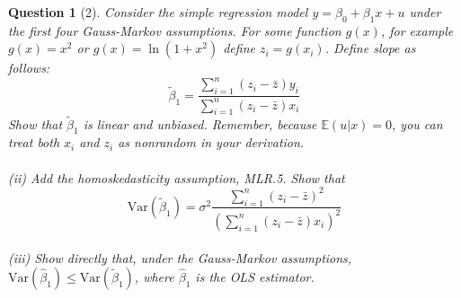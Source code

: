 \documentclass[12pt,reqno]{amsart}
\theoremstyle{plain}
\newcommand{\E}{\mathbb{E}}
\newcommand{\hb}{\hat\beta}
\newcommand{\tb}{\tilde\beta}
\newtheorem*{theorem*}{Question}
\begin{document}
\begin{theorem*}[2]
    \normalfont
    Consider the simple regression model $ y =  \beta_{0} + \beta_{1}x + u $ under the first four
    Gauss-Markov assumptions. For some function $ g(x) $, for example $ g(x) =x^{2} $ or $ g(x) = \ln(1+x^{2}) $
    define $ z_{i} = g(x_{i}) $. Define slope as follows:
    \[
        \tb_{1} = \frac{\sum_{i=1}^{n} (z_{i} - \bar{z})y_{i}}{\sum_{i=1}^{n} (z_{i} - \bar{z})x_{i}}
    \]
    Show that $ \tb_{1} $ is linear and unbiased. Remember, because $ \E(u|x) = 0 $, you can treat
    both $ x_i $ and $ z_i $ as nonrandom in your derivation.
    \\\\
    (ii) Add the homoskedasticity assumption, MLR.5. Show that
    \[
        \text{Var}(\tb_{1})= \sigma^{2}\frac{\sum_{i=1}^{n} (z_{i} - \bar{z})^{2}}{\left( \sum_{i=1}^{n} (z_{i} - \bar{z})x_{i}  \right)^{2}}
    \]
    \\
    (iii) Show directly that, under the Gauss-Markov assumptions, $ \text{Var}(\hb_{1}) \le  \text{Var}(\tb_{1})$,
    where $ \hb_{1} $ is the OLS estimator.
\end{theorem*}
\end{document}

